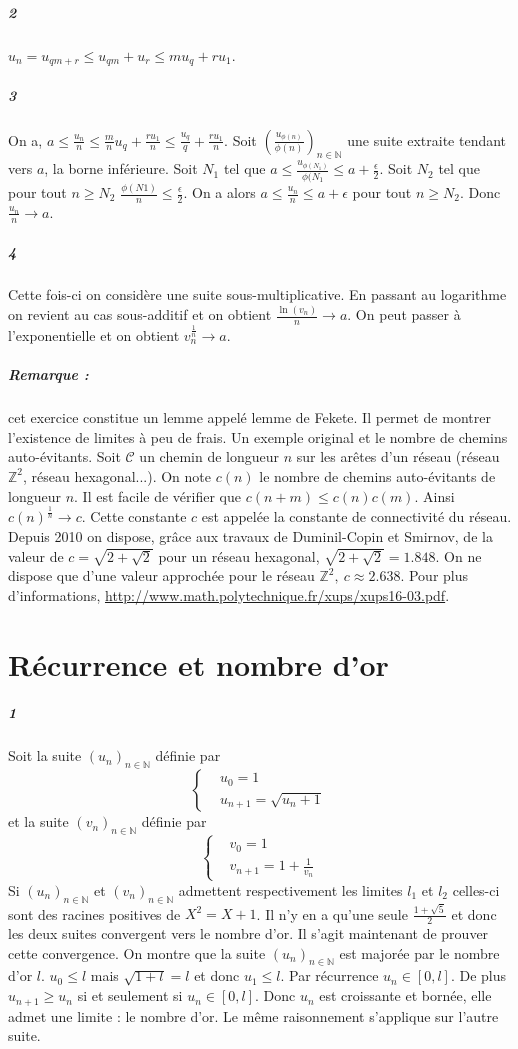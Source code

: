 \documentclass[10pt,a4paper]{article}
\newcommand{\al}[1]{\begin{aligned} #1 \end{aligned}}
\newcommand{\seq}[2]{\left( #1_{#2} \right)_{#2 \in \mathbb{N}} }
\begin{document}
\subparagraph{2}
$u_n = u_{qm+r} \le u_{qm} + u_r \le mu_q + ru_1$.

\subparagraph{3}
On a, $a \le \frac{u_n}{n} \le \frac{m}{n}u_q + \frac{ru_1}{n} \le \frac{u_q}{q} + \frac{ru_1}{n}$. Soit $\left(\frac{u_{\phi(n)}}{\phi(n)}\right)_{n \in \mathbb{N}}$ une suite extraite tendant vers $a$, la borne inférieure. Soit $N_1$ tel que $a \le \frac{u_{\phi(N_1)}}{\phi(N_1}\le a +\frac{\epsilon}{2}$. Soit $N_2$ tel que pour tout $n \ge N_2$ $\frac{\phi(N1)}{n} \le \frac{\epsilon}{2}$. On a alors $a \le \frac{u_{n}}{n} \le a + \epsilon$ pour tout $n \ge N_2$. Donc $\frac{u_n}{n} \rightarrow a$. 

\subparagraph{4}Cette fois-ci on considère une suite sous-multiplicative. En passant au logarithme on revient au cas sous-additif et on obtient $\frac{\ln(v_n)}{n} \rightarrow a$. On peut passer à l'exponentielle et on obtient $v_n^{\frac{1}{n}} \rightarrow a$.

\subparagraph{Remarque : } cet exercice constitue un lemme appelé lemme de Fekete. Il permet de montrer l'existence de limites à peu de frais. Un exemple original et le nombre de chemins auto-évitants. Soit $\mathcal{C}$ un chemin de longueur $n$ sur les arêtes d'un réseau (réseau $\mathbb{Z}^2$, réseau hexagonal...). On note $c(n)$ le nombre de chemins auto-évitants de longueur $n$. Il est facile de vérifier que $c(n+m) \le c(n)c(m)$. Ainsi $c(n)^{\frac{1}{n}} \rightarrow c$. Cette constante $c$ est appelée la constante de connectivité du réseau. Depuis 2010 on dispose, grâce aux travaux de Duminil-Copin et Smirnov, de la valeur de $c = \sqrt{2+\sqrt{2}}$ pour un réseau hexagonal, $\sqrt{2+\sqrt{2}} = 1.848$. On ne dispose que d'une valeur approchée pour le réseau $\mathbb{Z}^2, \ c \approx 2.638$. Pour plus d'informations, \url{http://www.math.polytechnique.fr/xups/xups16-03.pdf}.

\section{Récurrence et nombre d'or}
\subparagraph{1}Soit la suite $\seq{u}{n}$ définie par
\[
\left\lbrace
\al{
&u_0 = 1 \\
&u_{n+1} = \sqrt{u_n +1}
}
\right.
\]
et la suite $\seq{v}{n}$ définie par 
\[
\left\lbrace
\al{
&v_0 = 1 \\
&v_{n+1} = 1+\frac{1}{v_n}
}
\right.
\]
Si $\seq{u}{n}$ et $\seq{v}{n}$ admettent respectivement les limites $l_1$ et $l_2$ celles-ci sont des racines positives de $X^2 = X+1$. Il n'y en a qu'une seule $\frac{1+\sqrt{5}}{2}$ et donc les deux suites convergent vers le nombre d'or. Il s'agit maintenant de prouver cette convergence. On montre que la suite $\seq{u}{n}$ est majorée par le nombre d'or $l$. $u_0 \le l$ mais $\sqrt{1+l} = l$ et donc $u_1 \le l$. Par récurrence $u_n \in [0,l]$. De plus $u_{n+1} \ge u_n$ si et seulement si $u_n \in [0,l]$. Donc $u_n$ est croissante et bornée, elle admet une limite : le nombre d'or. Le même raisonnement s'applique sur l'autre suite.
\end{document}
